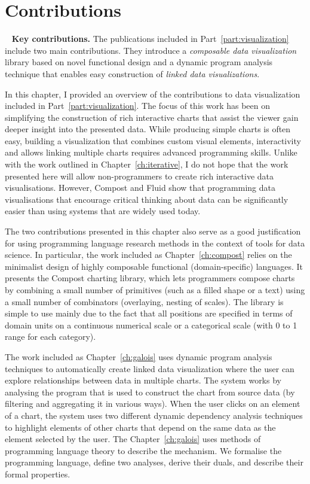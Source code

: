 \documentclass[fleqn,11pt]{report}
\theoremstyle{definition}
\DeclareRobustCommand{\keyideabox}[3]{\begin{tcolorbox}[breakable,
  boxsep=10pt,left=0pt,right=0pt,top=0pt,bottom=0pt,width=\dimexpr\textwidth\relax,
  colback=gray!20,colframe=gray!20,
  enlarge bottom by=5pt,enlarge top by=5pt,
  arc=0pt,outer arc=0pt]
\lettrine[lraise=0.3]{\LARGE #1}{~}
\textbf{#2.} #3
\end{tcolorbox}
}
\begin{document}
\section{Contributions}

\keyideabox{\faPencilSquareO}{Key contributions}{The publications included in Part~\ref{part:visualization}
include two main contributions. They introduce a \emph{composable data visualization} library
based on novel functional design and a dynamic program analysis technique that enables easy
construction of \emph{linked data visualizations}.}

\noindent
In this chapter, I provided an overview of the contributions to data visualization included in
Part~\ref{part:visualization}. The focus of this work has been on simplifying the construction
of rich interactive charts that assist the viewer gain deeper insight into the presented data.
While producing simple charts is often easy, building a visualization that combines custom
visual elements, interactivity and allows linking multiple charts requires advanced programming
skills. Unlike with the work outlined in Chapter~\ref{ch:iterative}, I do not hope that the work
presented here will allow non-programmers to create rich interactive data visualisations.
However, Compost and Fluid show that programming data visualisations that encourage critical
thinking about data can be significantly easier than using systems that are widely used today.

The two contributions presented in this chapter also serve as a good justification for using
programming language research methods in the context of tools for data science. In particular,
the work included as Chapter~\ref{ch:compost} relies on the minimalist design of highly composable
functional (domain-specific) languages. It presents the Compost charting library, which lets
programmers compose charts by combining a small number of primitives (such as a filled shape
or a text) using a small number of combinators (overlaying, nesting of scales). The library is
simple to use mainly due to the fact that all positions are specified in terms of domain units
on a continuous numerical scale or a categorical scale (with 0 to 1 range for each category).

The work included as Chapter~\ref{ch:galois} uses dynamic program analysis techniques to
automatically create linked data visualization where the user can explore relationships between
data in multiple charts. The system works by analysing the program that is used to construct the
chart from source data (by filtering and aggregating it in various ways). When the user clicks on
an element of a chart, the system uses two different dynamic dependency analysis techniques to
highlight elements of other charts that depend on the same data as the element selected by the user.
The Chapter~\ref{ch:galois} uses methods of programming language theory to describe the mechanism.
We formalise the programming language, define two analyses, derive their duals, and describe their
formal properties.
\end{document}
